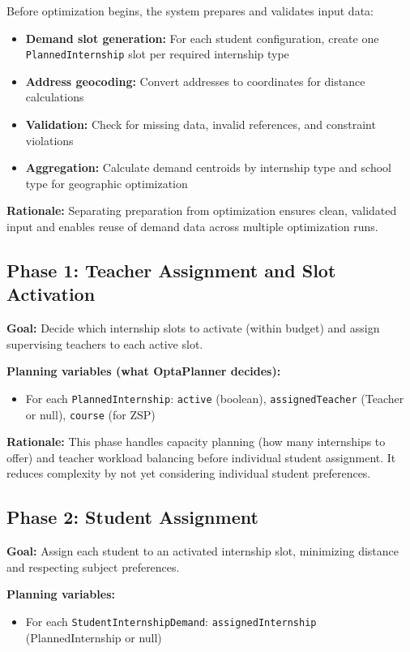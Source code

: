 \documentclass[12pt,a4paper]{report}
\begin{document}
Before optimization begins, the system prepares and validates input data:

\begin{itemize}
    \item \textbf{Demand slot generation:} For each student configuration, create one \texttt{PlannedInternship} slot per required internship type
    \item \textbf{Address geocoding:} Convert addresses to coordinates for distance calculations
    \item \textbf{Validation:} Check for missing data, invalid references, and constraint violations
    \item \textbf{Aggregation:} Calculate demand centroids by internship type and school type for geographic optimization
\end{itemize}

\textbf{Rationale:} Separating preparation from optimization ensures clean, validated input and enables reuse of demand data across multiple optimization runs.

\subsection{Phase 1: Teacher Assignment and Slot Activation}

\textbf{Goal:} Decide which internship slots to activate (within budget) and assign supervising teachers to each active slot.

\textbf{Planning variables (what OptaPlanner decides):}
\begin{itemize}
    \item For each \texttt{PlannedInternship}: \texttt{active} (boolean), \texttt{assignedTeacher} (Teacher or null), \texttt{course} (for ZSP)
\end{itemize}

\textbf{Rationale:} This phase handles capacity planning (how many internships to offer) and teacher workload balancing before individual student assignment. It reduces complexity by not yet considering individual student preferences.

\subsection{Phase 2: Student Assignment}

\textbf{Goal:} Assign each student to an activated internship slot, minimizing distance and respecting subject preferences.

\textbf{Planning variables:}
\begin{itemize}
    \item For each \texttt{StudentInternshipDemand}: \texttt{assignedInternship} (PlannedInternship or null)
\end{itemize}
\end{document}
